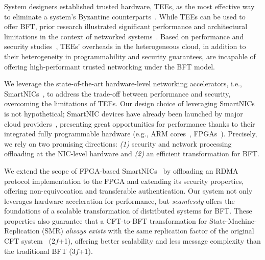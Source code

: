  System designers established trusted hardware, TEEs, as the most effective way to eliminate a system's Byzantine counterparts~\cite{avocado, minBFT, hybster, 10.1145/3492321.3519568}. While TEEs can be used to offer BFT, prior research illustrated significant performance and architectural limitations in the context of networked systems~\cite{avocado, 10.1145/3492321.3519568, hybster, minBFT}. Based on performance and security studies~\cite{9460547, 9935045}, TEEs' overheads in the heterogeneous cloud, in addition to their heterogeneity in programmability and security guarantees, are incapable of offering high-performant trusted networking under the BFT model. 


 We leverage the state-of-the-art hardware-level networking accelerators, i.e., SmartNICs~\cite{liquidIO_smartnics, u280_smartnics, bluefield_smartnics, broadcom_smartnics, netronome_smartnics, alibaba_smartnics, nitro_smartnics, msr_smartnics}, to address the trade-off between performance and security, overcoming the limitations of TEEs. Our design choice of leveraging SmartNICs is not hypothetical; SmartNIC devices have already been launched by major cloud providers~\cite{alibaba_smartnics, nitro_smartnics, msr_smartnics}, presenting great opportunities for performance thanks to their integrated fully programmable hardware (e.g., ARM cores~\cite{bluefield_smartnics, alibaba_smartnics, broadcom_smartnics, liquidIO_smartnics}, FPGAs~\cite{u280_smartnics, alveo_sn1000, msr_smartnics}). Precisely, we rely on two promising directions: {\em(1)} security and network processing offloading at the NIC-level hardware and {\em(2)} an efficient transformation for BFT. 

We extend the scope of FPGA-based SmartNICs~\cite{u280_smartnics, alveo_sn1000} by offloading an RDMA protocol implementation to the FPGA and extending its security properties, offering non-equivocation and transferable authentication. 
Our system not only leverages hardware acceleration for performance, but {\em seamlessly} offers the foundations of a scalable transformation of distributed systems for BFT. These properties also guarantee that a CFT-to-BFT transformation for State-Machine-Replication (SMR) {\em always exists} with the same replication factor of the original CFT system~\cite{clement2012, byzantine-pratical} (2$f$+1), offering better scalability and less message complexity than the traditional BFT (3$f$+1). %
\fi 

